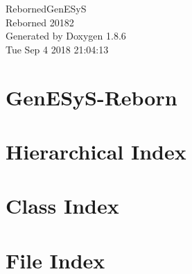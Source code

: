 \documentclass[twoside]{book}
\newcommand{\clearemptydoublepage}{%
  \newpage{\pagestyle{empty}\cleardoublepage}%
}
\begin{document}
\hypersetup{pageanchor=false}
\begin{titlepage}
\vspace*{7cm}
\begin{center}%
{\Large Reborned\-Gen\-E\-Sy\-S \\[1ex]\large Reborned 20182 }\\
\vspace*{1cm}
{\large Generated by Doxygen 1.8.6}\\
\vspace*{0.5cm}
{\small Tue Sep 4 2018 21:04:13}\\
\end{center}
\end{titlepage}
\clearemptydoublepage
\tableofcontents
\clearemptydoublepage
{}
\hypersetup{pageanchor=true}

\chapter{Gen\-E\-Sy\-S-\/\-Reborn}
\label{md__r_e_a_d_m_e}
\hypertarget{md__r_e_a_d_m_e}{}

\chapter{Hierarchical Index}

\chapter{Class Index}

\chapter{File Index}

\end{document}
